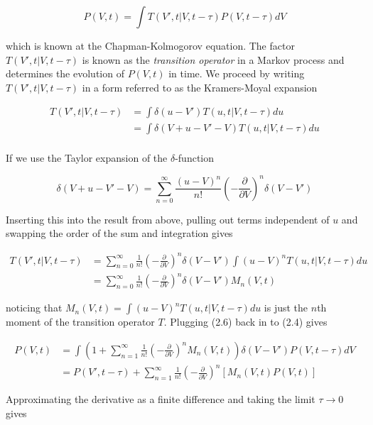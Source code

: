\documentclass{ucetd}
\begin{document}
\begin{equation}
P(V, t) = \int T(V', t | V, t-\tau)P(V, t-\tau)dV
\end{equation} 

which is known at the Chapman-Kolmogorov equation. The factor $T(V', t | V, t-\tau)$ is known as the \emph{transition operator} in a Markov process and determines the evolution of $P(V,t)$ in time. We proceed by writing $T(V', t | V, t-\tau)$ in a form referred to as the Kramers-Moyal expansion

\begin{align*}
T(V', t | V, t-\tau) &= \int \delta(u-V')T(u, t | V, t-\tau)du\\
&= \int \delta(V+u-V'-V)T(u, t | V, t-\tau)du\\
\end{align*} 

If we use the Taylor expansion of the $\delta$-function 

\begin{equation*}
\delta(V+u-V'-V) = \sum_{n=0}^{\infty} \frac{(u-V)^{n}}{n!}\left(-\frac{\partial}{\partial V}\right)^{n}\delta(V-V')
\end{equation*}

Inserting this into the result from above, pulling out terms independent of $u$ and swapping the order of the sum and integration gives

\begin{align}
T(V', t | V, t-\tau) &= \sum_{n=0}^{\infty} \frac{1}{n!}\left(-\frac{\partial}{\partial V}\right)^{n}\delta(V-V')\int(u-V)^{n}T(u, t | V, t-\tau)du\\
&= \sum_{n=0}^{\infty} \frac{1}{n!}\left(-\frac{\partial}{\partial V}\right)^{n}\delta(V-V')M_{n}(V,t)
\end{align} 

noticing that $M_{n}(V,t) = \int(u-V)^{n}T(u, t | V, t-\tau)du$ is just the $n$th moment of the transition operator $T$. Plugging (2.6) back in to (2.4) gives 

\begin{align}
P(V, t) &= \int \left(1 + \sum_{n=1}^{\infty} \frac{1}{n!}\left(-\frac{\partial}{\partial V}\right)^{n} M_{n}(V,t)\right)\delta(V-V')P(V, t-\tau)dV\\
&= P(V', t-\tau) + \sum_{n=1}^{\infty} \frac{1}{n!}\left(-\frac{\partial}{\partial V}\right)^{n} \left[M_{n}(V,t)P(V,t)\right]
\end{align} 

Approximating the derivative as a finite difference and taking the limit $\tau\rightarrow 0$ gives
\end{document}
